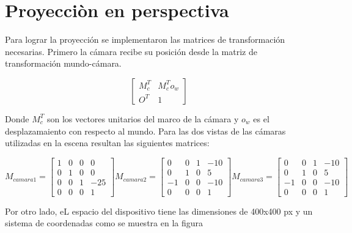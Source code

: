 \documentclass[12pt]{article}
\begin{document}
\section{Proyecciòn en perspectiva}

Para lograr la proyección se implementaron las matrices de transformación necesarias. Primero la cámara recibe su posición desde la matriz de transformación mundo-cámara.


\begin{equation}
\begin{bmatrix}
M_{c}^{T} &  M_{c}^{T}o_{w}\\
O^{T} & 1 

\end{bmatrix}
\end{equation} 

Donde $M_{c}^{T} $ son los vectores unitarios del marco de la cámara y $o_{w}$ es el desplazamaiento con respecto al mundo.
Para las dos vistas de las cámaras utilizadas en la escena resultan las siguientes matrices:

$$
M_{camara1}= \begin{bmatrix}
1 & 0 & 0& 0\\
0 & 1 & 0& 0\\
0 & 0 & 1&-25 \\
0 & 0 & 0&1
\end{bmatrix}
M_{camara2}= \begin{bmatrix}
0 & 0 & 1& -10\\
0 & 1 & 0& 5\\
-1 & 0 & 0&-10 \\
0 & 0 & 0&1
\end{bmatrix}
M_{camara3}= \begin{bmatrix}
0 & 0 & 1& -10\\
0 & 1 & 0& 5\\
-1 & 0 & 0&-10 \\
0 & 0 & 0&1
\end{bmatrix}
$$


Por otro lado, eL espacio del dispositivo tiene las dimensiones de 400x400 px y un sistema de coordenadas como se muestra en la figura
\end{document}
